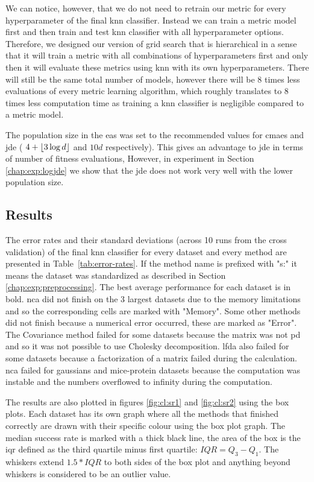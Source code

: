 \documentclass[12pt,a4paper]{report}
\begin{document}
We can notice, however, that we do not need to retrain our metric for every hyperparameter of the final \ac{knn} classifier. Instead we can train a metric model first and then train and test \ac{knn} classifier with all hyperparameter options. Therefore, we designed our version of grid search that is hierarchical in a sense that it will train a metric with all combinations of hyperparameters first and only then it will evaluate these metrics using \ac{knn} with its own hyperparameters. There will still be the same total number of models, however there will be 8 times less evaluations of every metric learning algorithm, which roughly translates to 8 times less computation time as training a \ac{knn} classifier is negligible compared to a metric model.

The population size in the \acp{ea} was set to the recommended values for \ac{cmaes} and \ac{jde} ( $4+\lfloor3\log{d}\rfloor$ and $10d$ respectively). This gives an advantage to \ac{jde} in terms of number of fitness evaluations, However, in experiment in Section \ref{chap:exp:logjde} we show that the \ac{jde} does not work very well with the lower population size.

\subsection{Results}

The error rates and their standard deviations (across 10 runs from the cross validation) of the final \ac{knn} classifier for every dataset and every method are presented in Table~\ref{tab:error-rates}. If the method name is prefixed with "s:" it means the dataset was standardized as described in Section \ref{chap:exp:preprocessing}. The best average performance for each dataset is in bold. \ac{nca} did not finish on the 3 largest datasets due to the memory limitations and so the corresponding cells are marked with "Memory". Some other methods did not finish because a numerical error occurred, these are marked as "Error". The Covariance method failed for some datasets because the matrix was not \ac{pd} and so it was not possible to use Cholesky decomposition. \ac{lfda} also failed for some datasets because a factorization of a matrix failed during the calculation. \ac{nca} failed for gaussians and mice-protein datasets because the computation was instable and the numbers overflowed to infinity during the computation.



The results are also plotted in figures \ref{fig:cl:sr1} and \ref{fig:cl:sr2} using the box plots. Each dataset has its own graph where all the methods that finished correctly are drawn with their specific colour using the box plot graph. The median success rate is marked with a thick black line, the area of the box is the \ac{iqr} defined as the third quartile minus first quartile: $IQR = Q_3 - Q_1$. The whiskers extend $1.5*IQR$ to both sides of the box plot and anything beyond whiskers is considered to be an outlier value.
\end{document}
